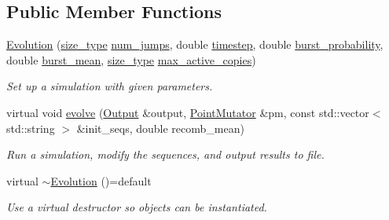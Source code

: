 \subsection*{Public Member Functions}
\begin{DoxyCompactItemize}
\item 
\hyperlink{classretrocombinator_1_1Evolution_a0aa94cf8dd5f6184535faf82842337fd}{Evolution} (\hyperlink{namespaceretrocombinator_a8e1541b50cee66a791df4c437ccbb385}{size\+\_\+type} \hyperlink{classretrocombinator_1_1Evolution_a043c016f93a961d0e3a2fc9d257b01d9}{num\+\_\+jumps}, double \hyperlink{classretrocombinator_1_1Evolution_afdb375b975d48d9915c6e8337c33a175}{timestep}, double \hyperlink{classretrocombinator_1_1Evolution_afb663b25070c1ca619e682cef2a32196}{burst\+\_\+probability}, double \hyperlink{classretrocombinator_1_1Evolution_ac2f4821269c08b23f21b5333f2067e5f}{burst\+\_\+mean}, \hyperlink{namespaceretrocombinator_a8e1541b50cee66a791df4c437ccbb385}{size\+\_\+type} \hyperlink{classretrocombinator_1_1Evolution_a0e6b2c75bdc36f8f482162f2f8c67d56}{max\+\_\+active\+\_\+copies})
\begin{DoxyCompactList}\small\item\em Set up a simulation with given parameters. \end{DoxyCompactList}\item 
virtual void \hyperlink{classretrocombinator_1_1Evolution_a0b8a181242ea8ee3072258fa7ed416f4}{evolve} (\hyperlink{classretrocombinator_1_1Output}{Output} \&output, \hyperlink{classretrocombinator_1_1PointMutator}{Point\+Mutator} \&pm, const std\+::vector$<$ std\+::string $>$ \&init\+\_\+seqs, double recomb\+\_\+mean)
\begin{DoxyCompactList}\small\item\em Run a simulation, modify the sequences, and output results to file. \end{DoxyCompactList}\item 
\mbox{\label{classretrocombinator_1_1Evolution_a6162b87324d550c4e4e9315a640a7259}} 
virtual \hyperlink{classretrocombinator_1_1Evolution_a6162b87324d550c4e4e9315a640a7259}{$\sim$\+Evolution} ()=default
\begin{DoxyCompactList}\small\item\em Use a virtual destructor so objects can be instantiated. \end{DoxyCompactList}\end{DoxyCompactItemize}
